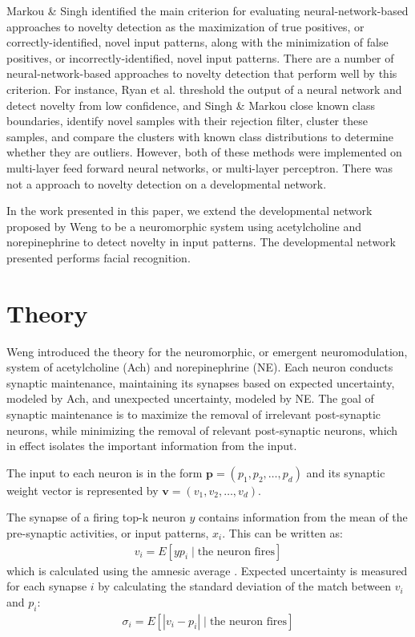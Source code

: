 \documentclass[conference]{IEEEtran}
\begin{document}
Markou \& Singh \cite{cit:3} identified the main criterion for evaluating neural-network-based approaches to novelty detection as the maximization of true positives, or correctly-identified, novel input patterns, along with the minimization of false positives, or incorrectly-identified, novel input patterns. There are a number of neural-network-based approaches to novelty detection that perform well by this criterion. For instance, Ryan et al. \cite{cit:4} threshold the output of a neural network and detect novelty from low confidence, and Singh \& Markou \cite{cit:5} close known class boundaries, identify novel samples with their rejection filter, cluster these samples, and compare the clusters with known class distributions to determine whether they are outliers. However, both of these methods were implemented on multi-layer feed forward neural networks, or multi-layer perceptron. There was not a approach to novelty detection on a developmental network.

In the work presented in this paper, we extend the developmental network proposed by Weng \cite{cit:2} to be a neuromorphic system using acetylcholine and norepinephrine to detect novelty in input patterns. The developmental network presented performs facial recognition.  

\section{Theory}
Weng \cite{cit:2} introduced the theory for the neuromorphic, or emergent neuromodulation, system of acetylcholine (Ach) and norepinephrine (NE). Each neuron conducts synaptic maintenance, maintaining its synapses based on expected uncertainty, modeled by Ach, and unexpected uncertainty, modeled by NE. The goal of synaptic maintenance is to maximize the removal of irrelevant post-synaptic neurons, while minimizing the removal of relevant post-synaptic neurons, which in effect isolates the important information from the input.

The input to each neuron is in the form $\mathbf{p}=(p_1,p_2,\dots,p_d)$ and its synaptic weight vector is represented by $\mathbf{v}=(v_1,v_2,\dots,v_d)$.

The synapse of a firing top-k neuron $y$ contains information from the mean of the pre-synaptic activities, or input patterns, $x_i$. This can be written as:
\begin{align}v_i=E[yp_i\; | \;\text{the neuron fires}] \end{align}
which is calculated using the amnesic average \cite{cit:2}. Expected uncertainty is measured for each synapse $i$ by calculating the standard deviation of the match between $v_i$ and $p_i$:
\begin{align}\sigma_i=E[|v_i-p_i|\;|\;\text{the neuron fires}]\end{align}
\end{document}
